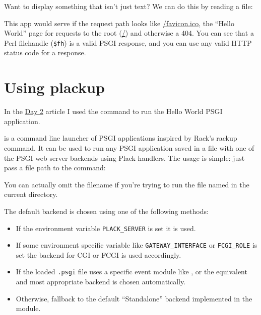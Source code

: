 Want to display something that isn't just text? We can do this by
reading a file:


This app would serve  if the request path looks like
\url{/favicon.ico}, the ``Hello World'' page for requests to the root (\url{/}) and
otherwise a 404. You can see that a Perl filehandle (\lstinline!$fh!) is
a valid PSGI response, and you can use any valid HTTP status code for a
response.

\chapter{Using plackup}\label{day-3-using-plackup}

In the
\href{http://advent.plackperl.org/2009/12/day-2-hello-world.html}{Day 2}
article I used the  command to run the Hello World PSGI
application.

 is a command line launcher of PSGI applications inspired by
Rack's rackup command. It can be used to run any PSGI application saved
in a  file with one of the PSGI web server backends using Plack
handlers. The usage is simple: just pass a  file path to the
command:


You can actually omit the filename if you're trying to run the file
named  in the current directory.

The default backend is chosen using one of the following methods:

\begin{itemize}
\itemsep1pt\parskip0pt
\item
  If the environment variable \lstinline!PLACK_SERVER! is set it is
  used.
\item
  If some environment specific variable like
  \lstinline!GATEWAY_INTERFACE! or \lstinline!FCGI_ROLE! is set the
  backend for CGI or FCGI is used accordingly.
\item
  If the loaded \lstinline!.psgi! file uses a specific event module like
  ,  or  the equivalent and most appropriate backend is
  chosen automatically.
\item
  Otherwise, fallback to the default ``Standalone'' backend implemented
  in the  module.
\end{itemize}


